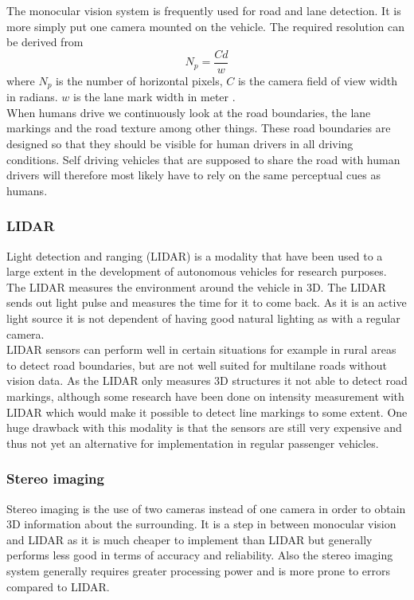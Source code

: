 The monocular vision system is frequently used for road and lane detection. It is more simply put one camera mounted on the vehicle. The required resolution can be derived from $$N_p = \frac{Cd}{w}$$where $N_p$ is the number of horizontal pixels, $C$ is the camera field of view width in radians. $w$ is the lane mark width in meter \cite{BarHillel2014}.\\

When humans drive we continuously look at the road boundaries, the lane markings and the road texture among other things. These road boundaries are designed so that they should be visible for human drivers in all driving conditions. Self driving vehicles that are supposed to share the road with human drivers will therefore most likely have to rely on the same perceptual cues as humans.

\subsubsection{LIDAR}
Light detection and ranging (LIDAR) is a modality that have been used to a large extent in the development of autonomous vehicles for research purposes. The LIDAR measures the environment around the vehicle in 3D. The LIDAR sends out light pulse and measures the time for it to come back. As it is an active light source it is not dependent of having good natural lighting as with a regular camera.\\

LIDAR sensors can perform well in certain situations for example in rural areas to detect road boundaries, \cite{BarHillel2014} but are not well suited for multilane roads without vision data. As the LIDAR only measures 3D structures it not able to detect road markings, although some research have been done on intensity measurement with LIDAR \cite{huang2009finding} \cite{kammel2008lidar} which would make it possible to detect line markings to some extent. One huge drawback with this modality is that the sensors are still very expensive and thus not yet an alternative for implementation in regular passenger vehicles.

\subsubsection{Stereo imaging}
Stereo imaging is the use of two cameras instead of one camera in order to obtain 3D information about the surrounding. It is a step in between monocular vision and LIDAR as it is much cheaper to implement than LIDAR but generally performs less good in terms of accuracy and reliability.  Also the stereo imaging system generally requires greater processing power and is more prone to errors compared to LIDAR. 


